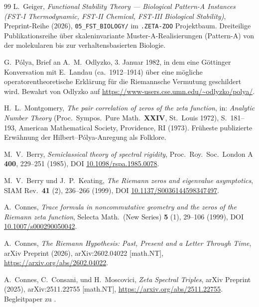 \documentclass[11pt]{article}
\theoremstyle{definition}
\theoremstyle{remark}
\begin{document}
\begin{thebibliography}{99}
L.~Geiger, \emph{Functional Stability Theory --- Biological
Pattern-A Instances (FST-I Thermodynamic, FST-II Chemical, FST-III
Biological Stability)}, Preprint-Reihe (2026),
\texttt{05\_FST\_BIOLOGY/}
im \texttt{.ZETA-ZOO} Projektbaum. Dreiteilige Publikationsreihe
über skaleninvariante Muster-A-Realisierungen (Pattern-A) von der molekularen
bis zur verhaltensbasierten Biologie.


G.~P\'olya, Brief an A.~M.~Odlyzko, 3. Januar 1982, in dem eine
Göttinger Konversation mit E.~Landau (ca.\ 1912--1914) über eine
mögliche operatorentheoretische Erklärung für die Riemannsche Vermutung
geschildert wird. Bewahrt von Odlyzko auf
\url{https://www-users.cse.umn.edu/~odlyzko/polya/}.

H.~L.~Montgomery, \emph{The pair correlation of zeros of the zeta
function}, in: \emph{Analytic Number Theory} (Proc.\ Sympos.\ Pure
Math.\ \textbf{XXIV}, St.\ Louis 1972), S.~181--193, American
Mathematical Society, Providence, RI (1973). Früheste publizierte
Erwähnung der Hilbert--P\'olya-Anregung als Folklore.

M.~V.~Berry, \emph{Semiclassical theory of spectral rigidity},
Proc.\ Roy.\ Soc.\ London A \textbf{400}, 229--251 (1985), DOI
\href{https://doi.org/10.1098/rspa.1985.0078}{10.1098/rspa.1985.0078}.

M.~V.~Berry und J.~P.~Keating, \emph{The Riemann zeros and
eigenvalue asymptotics}, SIAM Rev.\ \textbf{41} (2), 236--266 (1999),
DOI
\href{https://doi.org/10.1137/S0036144598347497}{10.1137/S0036144598347497}.

A.~Connes, \emph{Trace formula in noncommutative geometry and the
zeros of the Riemann zeta function}, Selecta Math.\ (New Series)
\textbf{5} (1), 29--106 (1999), DOI
\href{https://doi.org/10.1007/s000290050042}{10.1007/s000290050042}.

A.~Connes, \emph{The Riemann Hypothesis: Past, Present and a
Letter Through Time}, arXiv Preprint (2026), arXiv:2602.04022
[math.NT], \url{https://arxiv.org/abs/2602.04022}.

A.~Connes, C.~Consani, und H.~Moscovici, \emph{Zeta Spectral
Triples}, arXiv Preprint (2025), arXiv:2511.22755 [math.NT],
\url{https://arxiv.org/abs/2511.22755}. Begleitpaper zu
\cite{Connes2026}.


\end{thebibliography}
\end{document}
